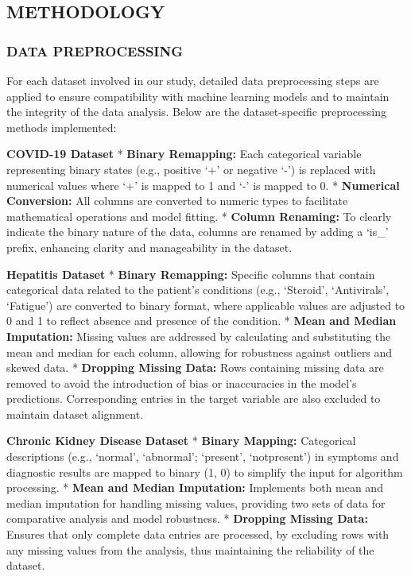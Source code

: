 \documentclass[11pt]{article}
\begin{document}
    

    \hypertarget{methodology}{%
\subsection{METHODOLOGY}\label{methodology}}

    \hypertarget{data-preprocessing}{%
\subsubsection{DATA PREPROCESSING}\label{data-preprocessing}}

    For each dataset involved in our study, detailed data preprocessing
steps are applied to ensure compatibility with machine learning models
and to maintain the integrity of the data analysis. Below are the
dataset-specific preprocessing methods implemented:

\textbf{COVID-19 Dataset} * \textbf{Binary Remapping:} Each categorical
variable representing binary states (e.g., positive `+' or negative `-')
is replaced with numerical values where `+' is mapped to 1 and `-' is
mapped to 0. * \textbf{Numerical Conversion:} All columns are converted
to numeric types to facilitate mathematical operations and model
fitting. * \textbf{Column Renaming:} To clearly indicate the binary
nature of the data, columns are renamed by adding a `is\_' prefix,
enhancing clarity and manageability in the dataset.

\textbf{Hepatitis Dataset} * \textbf{Binary Remapping:} Specific columns
that contain categorical data related to the patient's conditions (e.g.,
`Steroid', `Antivirals', `Fatigue') are converted to binary format,
where applicable values are adjusted to 0 and 1 to reflect absence and
presence of the condition. * \textbf{Mean and Median Imputation:}
Missing values are addressed by calculating and substituting the mean
and median for each column, allowing for robustness against outliers and
skewed data. * \textbf{Dropping Missing Data:} Rows containing missing
data are removed to avoid the introduction of bias or inaccuracies in
the model's predictions. Corresponding entries in the target variable
are also excluded to maintain dataset alignment.

\textbf{Chronic Kidney Disease Dataset} * \textbf{Binary Mapping:}
Categorical descriptions (e.g., `normal', `abnormal'; `present',
`notpresent') in symptoms and diagnostic results are mapped to binary
(1, 0) to simplify the input for algorithm processing. * \textbf{Mean
and Median Imputation:} Implements both mean and median imputation for
handling missing values, providing two sets of data for comparative
analysis and model robustness. * \textbf{Dropping Missing Data:} Ensures
that only complete data entries are processed, by excluding rows with
any missing values from the analysis, thus maintaining the reliability
of the dataset.
\end{document}
